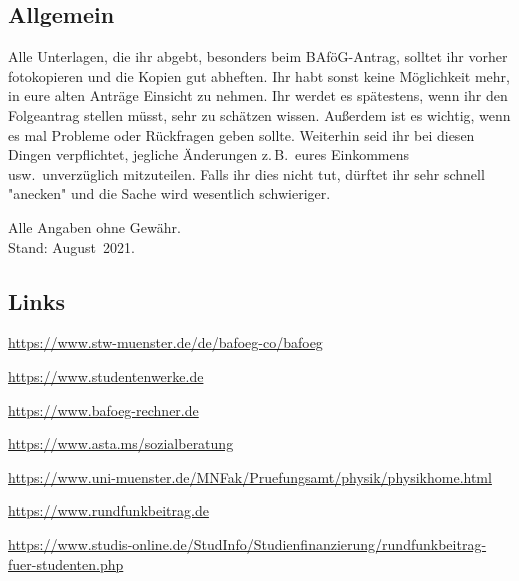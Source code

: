 \begin{multicols*}{2}
\vspace{-2ex}

\subsection{Allgemein}
Alle Unterlagen, die ihr abgebt, besonders beim BAföG-Antrag, solltet ihr vorher fotokopieren und die Kopien gut abheften.
Ihr habt sonst keine Möglichkeit mehr, in eure alten Anträge Einsicht zu nehmen.
Ihr werdet es spätestens, wenn ihr den Folgeantrag stellen müsst, sehr zu schätzen wissen.
Außerdem ist es wichtig, wenn es mal Probleme oder Rückfragen geben sollte.
Weiterhin seid ihr bei diesen Dingen verpflichtet, jegliche Änderungen z.\,B.\ eures Einkommens usw.\ unverzüglich mitzuteilen.
Falls ihr dies nicht tut, dürftet ihr sehr schnell "anecken" und die Sache wird wesentlich schwieriger.

\begin{flushright}
	Alle Angaben ohne Gewähr.\\
	Stand: August~2021.
\end{flushright}

\vspace{-2ex}

\subsection{Links}
\begin{flushleft}
	\footnotesize
	\begin{fibelurl}
		\label{geld:bmbf}
	\end{fibelurl}
	\begin{fibelurl}
		\url{https://www.stw-muenster.de/de/bafoeg-co/bafoeg}
		\label{geld:studierendenwerk-ms}
	\end{fibelurl}
	\begin{fibelurl}
		\url{https://www.studentenwerke.de}
		\label{geld:studentenwerke}
	\end{fibelurl}
	\begin{fibelurl}
		\url{https://www.bafoeg-rechner.de}
		\label{geld:bafoeg-rechner}
	\end{fibelurl}
	\begin{fibelurl}
		\url{https://www.asta.ms/sozialberatung}
		\label{geld:asta_sozialberatung}
	\end{fibelurl}
	\begin{fibelurl}
		\url{https://www.uni-muenster.de/MNFak/Pruefungsamt/physik/physikhome.html}
		\label{geld:pa_physik}
	\end{fibelurl}
	\begin{fibelurl}
		\url{https://www.rundfunkbeitrag.de}
		\label{geld:rundfunkbeitrag}
	\end{fibelurl}
	\begin{fibelurl}
		\url{https://www.studis-online.de/StudInfo/Studienfinanzierung/rundfunkbeitrag-fuer-studenten.php}
		\label{geld:rundfunkbeitrag_studenten}
	\end{fibelurl}
\end{flushleft}

\end{multicols*}
